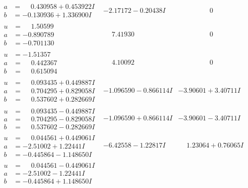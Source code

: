 \documentclass[1p]{elsarticle_modified}
\theoremstyle{definition}
\begin{document}
$$\begin{array}{c|c|c}
\begin{aligned}
a &= \phantom{-}0.430958 + 0.453922 I \\
b &= -0.130936 + 1.336900 I\end{aligned}
 & -2.17172 - 0.20438 I & \phantom{-0.000000 } 0 \\ \hline\begin{aligned}
u &= \phantom{-}1.50599\phantom{ +0.000000I} \\
a &= -0.890789\phantom{ +0.000000I} \\
b &= -0.701130\phantom{ +0.000000I}\end{aligned}
 & \phantom{-}7.41930\phantom{ +0.000000I} & \phantom{-0.000000 } 0 \\ \hline\begin{aligned}
u &= -1.51357\phantom{ +0.000000I} \\
a &= \phantom{-}0.442367\phantom{ +0.000000I} \\
b &= \phantom{-}0.615094\phantom{ +0.000000I}\end{aligned}
 & \phantom{-}4.10092\phantom{ +0.000000I} & \phantom{-0.000000 } 0 \\ \hline\begin{aligned}
u &= \phantom{-}0.093435 + 0.449887 I \\
a &= \phantom{-}0.704295 + 0.829058 I \\
b &= \phantom{-}0.537602 + 0.282669 I\end{aligned}
 & -1.096590 - 0.866114 I & -3.90601 + 3.40711 I \\ \hline\begin{aligned}
u &= \phantom{-}0.093435 - 0.449887 I \\
a &= \phantom{-}0.704295 - 0.829058 I \\
b &= \phantom{-}0.537602 - 0.282669 I\end{aligned}
 & -1.096590 + 0.866114 I & -3.90601 - 3.40711 I \\ \hline\begin{aligned}
u &= \phantom{-}0.044561 + 0.449061 I \\
a &= -2.51002 + 1.22441 I \\
b &= -0.445864 - 1.148650 I\end{aligned}
 & -6.42558 - 1.22817 I & \phantom{-}1.23064 + 0.76065 I \\ \hline\begin{aligned}
u &= \phantom{-}0.044561 - 0.449061 I \\
a &= -2.51002 - 1.22441 I \\
b &= -0.445864 + 1.148650 I\end{aligned}

\end{array}$$
\end{document}

